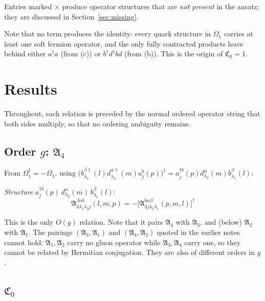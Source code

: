 \documentclass[11pt]{article}
\newcommand{\mf}{\mathfrak}
\newcommand{\dg}{\dagger}
\newcommand{\OM}{\Omega}
\begin{document}
Entries marked $\times$ produce operator structures that are \emph{not present} in the ansatz;
they are discussed in Section~\ref{sec:missing}.

Note that no term produces the identity: every quark structure in $\OM_{1}$ carries at least one
soft fermion operator, and the only fully contracted products leave behind either $a^{\dg}a$
(from (c)) or $b^{\dg}d^{\dg}bd$ (from (b)). This is the origin of $\mf C_{0}=1$.

\section{Results}

Throughout, each relation is preceded by the normal ordered operator string that both sides
multiply, so that no ordering ambiguity remains.

\subsection{Order $g$: $\mf A_{4}$}

From $\OM^{\dg}_{1}=-\OM_{1}$, using
$\big(b^{\beta\dg}_{\lambda_{1}}(l)d^{\alpha\dg}_{\lambda_{2}}(m)a^{b}_{j}(p)\big)^{\dg}
=a^{\dg b}_{j}(p)d^{\alpha}_{\lambda_{2}}(m)b^{\beta}_{\lambda_{1}}(l)$:

\begin{res}
\emph{Structure} $a^{\dg b}_{j}(p)\,d^{\alpha}_{\lambda_{2}}(m)\,b^{\beta}_{\lambda_{1}}(l)$:
\begin{equation}
\boxed{\;
\mf A^{\beta\alpha b}_{4\lambda_{1}\lambda_{2}j}(l,m,p)
=-\Big[\mf A^{b\alpha\beta}_{3j\lambda_{2}\lambda_{1}}(p,m,l)\Big]^{\dg}
\;}
\label{eq:A4}
\end{equation}
\end{res}

\noindent
This is the only $O(g)$ relation. Note that it pairs $\mf A_{4}$ with $\mf A_{3}$, and (below)
$\mf A_{2}$ with $\mf A_{1}$. The pairings $(\mf A_{3},\mf A_{1})$ and $(\mf A_{4},\mf A_{2})$
quoted in the earlier notes cannot hold: $\mf A_{1},\mf A_{2}$ carry no gluon operator while
$\mf A_{3},\mf A_{4}$ carry one, so they cannot be related by Hermitian conjugation. They are
also of different orders in $g$.

\subsection{$\mf C_{0}$}
\end{document}
